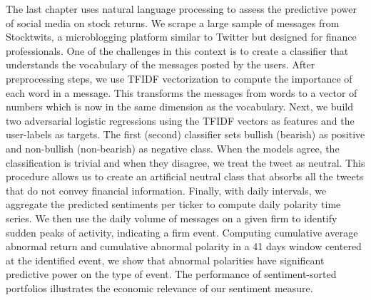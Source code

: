 \clearpage
The last chapter uses natural language processing to assess the predictive power of social media on stock returns. We scrape a large sample of messages from Stocktwits, a microblogging platform similar to Twitter but designed for finance professionals. One of the challenges in this context is to create a classifier that understands the vocabulary of the messages posted by the users. After preprocessing steps, we use TFIDF vectorization to compute the importance of each word in a message. This transforms the messages from words to a vector of numbers which is now in the same dimension as the vocabulary. Next, we build two adversarial logistic regressions using the TFIDF vectors as features and the user-labels as targets. The first (second) classifier sets bullish (bearish) as positive and non-bullish (non-bearish) as negative class. When the models agree, the classification is trivial and when they disagree, we treat the tweet as neutral. This procedure allows us to create an artificial neutral class that absorbs all the tweets that do not convey financial information. Finally, with daily intervals, we aggregate the predicted sentiments per ticker to compute daily polarity time series. We then use the daily volume of messages on a given firm to identify sudden peaks of activity, indicating a firm event. Computing cumulative average abnormal return and cumulative abnormal polarity in a 41 days window centered at the identified event, we show that abnormal polarities have significant predictive power on the type of event. The performance of sentiment-sorted portfolios illustrates the economic relevance of our sentiment measure.



